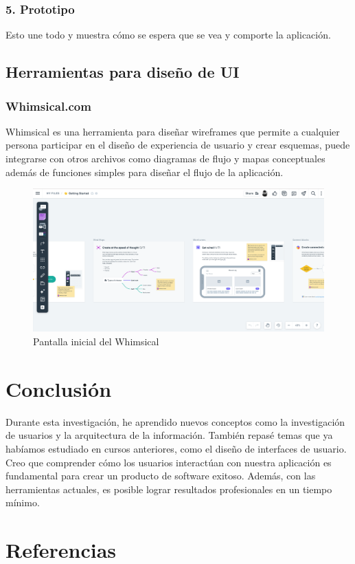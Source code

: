 \documentclass[11pt]{article}
\begin{document}
\subsubsection{5. Prototipo}
\label{sec:orgcea648b}
Esto une todo y muestra cómo se espera que se vea y comporte la aplicación.


\subsection{Herramientas para diseño de UI}
\label{sec:org2cf6128}
\subsubsection{Whimsical.com}
\label{sec:org05b275c}
Whimsical es una herramienta para diseñar wireframes que permite a cualquier persona 
participar en el diseño de experiencia de usuario y crear esquemas, puede integrarse
con otros archivos como diagramas de flujo y mapas conceptuales además de funciones
simples para diseñar el flujo de la aplicación.

\begin{figure}[htbp]
\centering
\includegraphics[width=.9\linewidth]{images/Captura de pantalla de 2023-08-19 17-35-40.png}
\caption{Pantalla inicial del Whimsical}
\end{figure}

\section{Conclusión}
\label{sec:orga4847d1}
Durante esta investigación, he aprendido nuevos conceptos como la investigación
de usuarios y la arquitectura de la información. También repasé temas que ya 
habíamos estudiado en cursos anteriores, como el diseño de interfaces de 
usuario. Creo que comprender cómo los usuarios interactúan con nuestra 
aplicación es fundamental para crear un producto de software exitoso. Además,
con las herramientas actuales, es posible lograr resultados profesionales en un
tiempo mínimo.


\pagebreak

\section{Referencias}
\label{sec:orgc01b4c6}
\printbibliography[heading=none]
\end{document}
